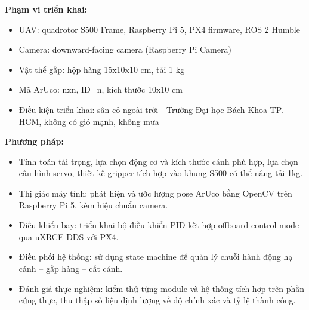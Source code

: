 \begin{mdframed}[style=decuongfield]
\vspace{1mm}
\textbf{Phạm vi triển khai:} 
\begin{itemize}
  \item UAV: quadrotor S500 Frame, Raspberry Pi 5, PX4 firmware, ROS 2 Humble
  \item Camera: downward-facing camera (Raspberry Pi Camera)
  \item Vật thể gắp: hộp hàng 15x10x10 cm, tải 1 kg
  \item Mã ArUco: nxn, ID=n, kích thước 10x10 cm
  \item Điều kiện triển khai: sân cỏ ngoài trời - Trường Đại học Bách Khoa TP. HCM, không có gió mạnh, không mưa
\end{itemize}
\par\vspace{-2mm}
\noindent\makebox[\linewidth][l]{\hspace*{-2.5mm}\rule{\dimexpr\linewidth+5mm\relax}{0.4pt}}\par


\vspace{1mm}
\textbf{Phương pháp:} 
\begin{itemize}
\item Tính toán tải trọng, lựa chọn động cơ và kích thước cánh phù hợp, lựa chọn cấu hình servo, thiết kế gripper tích hợp vào khung S500 có thể nâng tải 1kg.
\item Thị giác máy tính: phát hiện và ước lượng pose ArUco bằng OpenCV trên Raspberry Pi 5, kèm hiệu chuẩn camera.
\item Điều khiển bay: triển khai bộ điều khiển PID kết hợp offboard control mode qua uXRCE-DDS với PX4.
\item Điều phối hệ thống: sử dụng state machine để quản lý chuỗi hành động hạ cánh – gắp hàng – cất cánh.
\item Đánh giá thực nghiệm: kiểm thử từng module và hệ thống tích hợp trên phần cứng thực, thu thập số liệu định lượng về độ chính xác và tỷ lệ thành công.
\end{itemize}
\par\vspace{-2mm}
\noindent\makebox[\linewidth][l]{\hspace*{-2.5mm}\rule{\dimexpr\linewidth+5mm\relax}{0.4pt}}\par



\end{mdframed}
